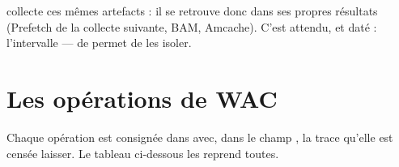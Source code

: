 \documentclass[11pt,a4paper,oneside]{report}
\begin{document}
\begin{note}
\wac{} collecte ces mêmes artefacts : il se retrouve donc dans ses propres
résultats (Prefetch de la collecte suivante, BAM, Amcache). C'est attendu, et
daté : l'intervalle  ---  de
 permet de les isoler.
\end{note}

\section{Les opérations de WAC}

Chaque opération est consignée dans  avec, dans le
champ , la trace qu'elle est censée laisser. Le tableau
ci-dessous les reprend toutes.
\end{document}
